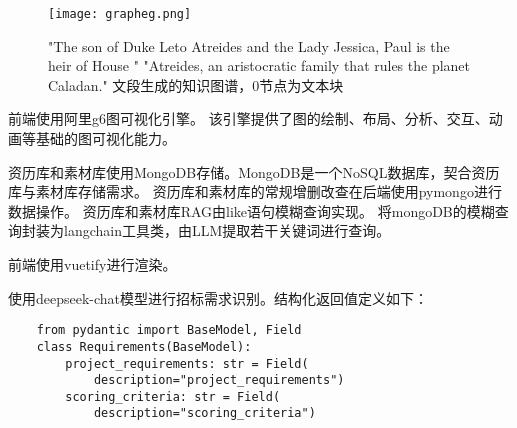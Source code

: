 \documentclass{xmu}
\begin{document}
    \begin{figure}[!htb]
        \centering
        \texttt{[image: grapheg.png]}\\
        \caption{
        "The son of Duke Leto Atreides and the Lady Jessica, Paul is the heir of House "
        "Atreides, an aristocratic family that rules the planet Caladan."
        文段生成的知识图谱，0节点为文本块
        }\label{example}
    \end{figure}

    前端使用阿里g6图可视化引擎。
    该引擎提供了图的绘制、布局、分析、交互、动画等基础的图可视化能力。

    资历库和素材库使用MongoDB存储。MongoDB是一个NoSQL数据库，契合资历库与素材库存储需求。
    资历库和素材库的常规增删改查在后端使用pymongo进行数据操作。
    资历库和素材库RAG由like语句模糊查询实现。
    将mongoDB的模糊查询封装为langchain工具类，由LLM提取若干关键词进行查询。
    
    前端使用vuetify进行渲染。

    使用deepseek-chat模型进行招标需求识别。结构化返回值定义如下：
    \begin{verbatim}
    from pydantic import BaseModel, Field
    class Requirements(BaseModel):
        project_requirements: str = Field(
            description="project_requirements")
        scoring_criteria: str = Field(
            description="scoring_criteria")
    \end{verbatim}

\end{document}
